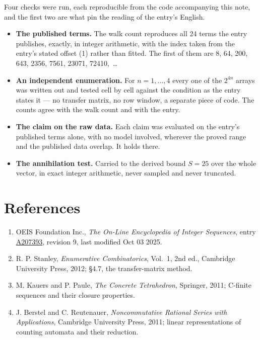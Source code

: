 \documentclass[11pt]{article}
\theoremstyle{definition}
\begin{document}
Four checks were run, each reproducible from the code accompanying this note, and the first two are what pin the reading of the entry's English.

\begin{itemize}

\item {\bfseries The published terms.} The walk count reproduces all 24 terms the entry publishes, exactly, in integer arithmetic, with the index taken from the entry's stated offset (1) rather than fitted. The first of them are 8, 64, 200, 643, 2356, 7561, 23071, 72410,~\dots

\item {\bfseries An independent enumeration.} For $n = 1,\dots,4$ every one of the $2^{4n}$ arrays was written out and tested cell by cell against the condition as the entry states it --- no transfer matrix, no row window, a separate piece of code. The counts agree with the walk count and with the entry.

\item {\bfseries The claim on the raw data.} Each claim was evaluated on the entry's published terms alone, with no model involved, wherever the proved range and the published data overlap. It holds there.

\item {\bfseries The annihilation test.} Carried to the derived bound $S = 25$ over the whole vector, in exact integer arithmetic, never sampled and never truncated.

\end{itemize}

\section{References}

\begin{enumerate}

\item OEIS Foundation Inc., \emph{The On-Line Encyclopedia of Integer Sequences}, entry \href{https://oeis.org/A207393}{A207393}, revision 9, last modified Oct 03 2025.

\item R. P. Stanley, \emph{Enumerative Combinatorics}, Vol.~1, 2nd ed., Cambridge University Press, 2012; \S4.7, the transfer-matrix method.

\item M. Kauers and P. Paule, \emph{The Concrete Tetrahedron}, Springer, 2011; C-finite sequences and their closure properties.

\item J. Berstel and C. Reutenauer, \emph{Noncommutative Rational Series with Applications}, Cambridge University Press, 2011; linear representations of counting automata and their reduction.

\end{enumerate}
\end{document}
